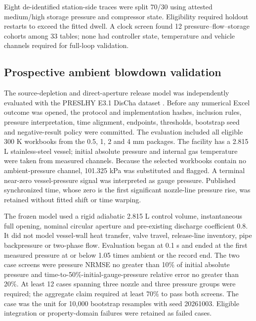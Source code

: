 \documentclass[12pt,a4paper]{article}
\begin{document}
Eight de-identified station-side traces were split 70/30 using attested
medium/high storage pressure and compressor state. Eligibility required
holdout restarts to exceed the fitted dwell. A clock screen found 12
pressure--flow--storage cohorts among 33 tables; none had controller state,
temperature and vehicle channels required for full-loop validation.

\subsection{Prospective ambient blowdown validation}
The source-depletion and direct-aperture release model was independently evaluated
with the PRESLHY E3.1 DisCha dataset \cite{preslhy2023}. Before any numerical Excel
outcome was opened, the protocol and implementation hashes, inclusion rules,
pressure interpretation, time alignment, endpoints, thresholds, bootstrap seed
and negative-result policy were committed. The evaluation included all eligible
300 K workbooks from the 0.5, 1, 2 and 4 mm packages. The facility has a 2.815 L
stainless-steel vessel; initial absolute pressure and internal gas temperature
were taken from measured channels. Because the selected workbooks contain no
ambient-pressure channel, 101.325 kPa was substituted and flagged. A terminal
near-zero vessel-pressure signal was interpreted as gauge pressure. Published
synchronized time, whose zero is the first significant nozzle-line pressure rise,
was retained without fitted shift or time warping.

The frozen model used a rigid adiabatic 2.815 L control volume, instantaneous full
opening, nominal circular aperture and pre-existing discharge coefficient 0.8.
It did not model vessel-wall heat transfer, valve travel, release-line inventory,
pipe backpressure or two-phase flow. Evaluation began at 0.1 s and ended at the
first measured pressure at or below 1.05 times ambient or the record end. The two
case screens were pressure NRMSE no greater than 10\% of initial absolute pressure
and time-to-50\%-initial-gauge-pressure relative error no greater than 20\%.
At least 12 cases spanning three nozzle and three pressure groups were required;
the aggregate claim required at least 70\% to pass both screens. The case was the
unit for 10,000 bootstrap resamples with seed 20261003. Eligible integration or
property-domain failures were retained as failed cases.
\end{document}
